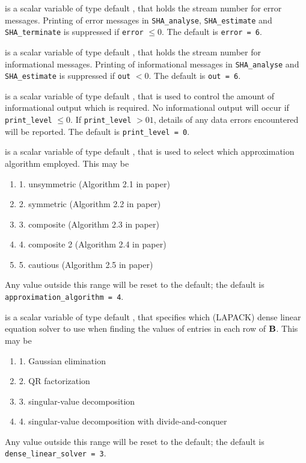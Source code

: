 \documentclass{galahad}
\newcommand{\packagename}{SHA}
\begin{document}
\begin{description}

 is a scalar variable of type default \integer, that holds the
stream number for error messages. Printing of error messages in 
{\tt \packagename\_analyse},
{\tt \packagename\_estimate} 
and {\tt \packagename\_terminate} 
is suppressed if {\tt error} $\leq 0$.
The default is {\tt error = 6}.

 is a scalar variable of type default \integer, that holds the
stream number for informational messages. Printing of informational messages in 
{\tt \packagename\_analyse} and {\tt \packagename\_estimate} 
is suppressed if {\tt out} $< 0$.
The default is {\tt out = 6}.

 is a scalar variable of type default \integer, that is used
to control the amount of informational output which is required. No 
informational output will occur if {\tt print\_level} $\leq 0$. If 
{\tt print\_level} $> 01$, details of any data errors encountered 
will be reported.
The default is {\tt print\_level = 0}.

 is a scalar variable of type default \integer, 
that is used to select which approximation algorithm employed. This may be
\begin{enumerate}
\item 1. unsymmetric (Algorithm 2.1 in paper)
\item 2. symmetric (Algorithm 2.2 in paper)
\item 3. composite (Algorithm 2.3 in paper)
\item 4. composite 2 (Algorithm 2.4 in paper)
\item 5. cautious (Algorithm 2.5 in paper)
\end{enumerate}
Any value outside this range will be reset to the default;
the default is {\tt approximation\_algorithm = 4}.

 is a scalar variable of type default \integer, 
that specifies which (LAPACK) dense linear equation solver to use when finding
the values of entries in each row of ${\mathbf{B}}$. This may be
\begin{enumerate}
\item 1. Gaussian elimination
\item 2. QR factorization
\item 3. singular-value decomposition
\item 4. singular-value decomposition with divide-and-conquer
\end{enumerate}
Any value outside this range will be reset to the default;
the default is {\tt dense\_linear\_solver = 3}.


\end{description}
\end{document}
